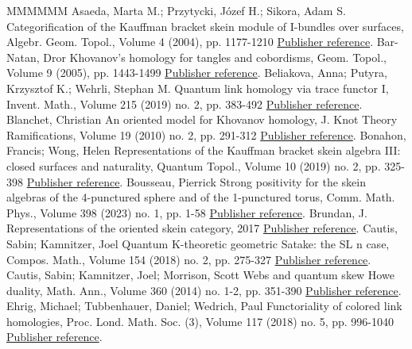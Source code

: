\begin{thebibliography}{MMMMMM}
 Asaeda, Marta M.; Przytycki, Józef H.; Sikora, Adam S. Categorification of the Kauffman bracket skein module of I-bundles over surfaces, Algebr. Geom. Topol., Volume 4 (2004), pp. 1177-1210 \href{https://alco.centre-mersenne.org/articles/10.5802/alco.330/#APS}{Publisher reference}.
 Bar-Natan, Dror Khovanov’s homology for tangles and cobordisms, Geom. Topol., Volume 9 (2005), pp. 1443-1499 \href{https://alco.centre-mersenne.org/articles/10.5802/alco.330/#BN2}{Publisher reference}.
 Beliakova, Anna; Putyra, Krzysztof K.; Wehrli, Stephan M. Quantum link homology via trace functor I, Invent. Math., Volume 215 (2019) no. 2, pp. 383-492 \href{https://alco.centre-mersenne.org/articles/10.5802/alco.330/#BPW}{Publisher reference}.
 Blanchet, Christian An oriented model for Khovanov homology, J. Knot Theory Ramifications, Volume 19 (2010) no. 2, pp. 291-312 \href{https://alco.centre-mersenne.org/articles/10.5802/alco.330/#Blan}{Publisher reference}.
 Bonahon, Francis; Wong, Helen Representations of the Kauffman bracket skein algebra III: closed surfaces and naturality, Quantum Topol., Volume 10 (2019) no. 2, pp. 325-398 \href{https://alco.centre-mersenne.org/articles/10.5802/alco.330/#BW1}{Publisher reference}.
 Bousseau, Pierrick Strong positivity for the skein algebras of the 4-punctured sphere and of the 1-punctured torus, Comm. Math. Phys., Volume 398 (2023) no. 1, pp. 1-58 \href{https://alco.centre-mersenne.org/articles/10.5802/alco.330/#Bou}{Publisher reference}.
 Brundan, J. Representations of the oriented skein category, 2017 \href{https://alco.centre-mersenne.org/articles/10.5802/alco.330/#Bru}{Publisher reference}.
 Cautis, Sabin; Kamnitzer, Joel Quantum K-theoretic geometric Satake: the  SL  n  case, Compos. Math., Volume 154 (2018) no. 2, pp. 275-327 \href{https://alco.centre-mersenne.org/articles/10.5802/alco.330/#CK_ann}{Publisher reference}.
 Cautis, Sabin; Kamnitzer, Joel; Morrison, Scott Webs and quantum skew Howe duality, Math. Ann., Volume 360 (2014) no. 1-2, pp. 351-390 \href{https://alco.centre-mersenne.org/articles/10.5802/alco.330/#CKM}{Publisher reference}.
 Ehrig, Michael; Tubbenhauer, Daniel; Wedrich, Paul Functoriality of colored link homologies, Proc. Lond. Math. Soc. (3), Volume 117 (2018) no. 5, pp. 996-1040 \href{https://alco.centre-mersenne.org/articles/10.5802/alco.330/#ETW}{Publisher reference}.

\end{thebibliography}
